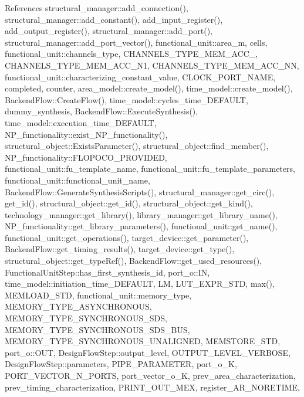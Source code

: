 References structural\+\_\+manager\+::add\+\_\+connection(), structural\+\_\+manager\+::add\+\_\+constant(), add\+\_\+input\+\_\+register(), add\+\_\+output\+\_\+register(), structural\+\_\+manager\+::add\+\_\+port(), structural\+\_\+manager\+::add\+\_\+port\+\_\+vector(), functional\+\_\+unit\+::area\+\_\+m, cells, functional\+\_\+unit\+::channels\+\_\+type, C\+H\+A\+N\+N\+E\+L\+S\+\_\+\+T\+Y\+P\+E\+\_\+\+M\+E\+M\+\_\+\+A\+C\+C\+\_, C\+H\+A\+N\+N\+E\+L\+S\+\_\+\+T\+Y\+P\+E\+\_\+\+M\+E\+M\+\_\+\+A\+C\+C\+\_\+\+N1, C\+H\+A\+N\+N\+E\+L\+S\+\_\+\+T\+Y\+P\+E\+\_\+\+M\+E\+M\+\_\+\+A\+C\+C\+\_\+\+NN, functional\+\_\+unit\+::characterizing\+\_\+constant\+\_\+value, C\+L\+O\+C\+K\+\_\+\+P\+O\+R\+T\+\_\+\+N\+A\+ME, completed, counter, area\+\_\+model\+::create\+\_\+model(), time\+\_\+model\+::create\+\_\+model(), Backend\+Flow\+::\+Create\+Flow(), time\+\_\+model\+::cycles\+\_\+time\+\_\+\+D\+E\+F\+A\+U\+LT, dummy\+\_\+synthesis, Backend\+Flow\+::\+Execute\+Synthesis(), time\+\_\+model\+::execution\+\_\+time\+\_\+\+D\+E\+F\+A\+U\+LT, N\+P\+\_\+functionality\+::exist\+\_\+\+N\+P\+\_\+functionality(), structural\+\_\+object\+::\+Exists\+Parameter(), structural\+\_\+object\+::find\+\_\+member(), N\+P\+\_\+functionality\+::\+F\+L\+O\+P\+O\+C\+O\+\_\+\+P\+R\+O\+V\+I\+D\+ED, functional\+\_\+unit\+::fu\+\_\+template\+\_\+name, functional\+\_\+unit\+::fu\+\_\+template\+\_\+parameters, functional\+\_\+unit\+::functional\+\_\+unit\+\_\+name, Backend\+Flow\+::\+Generate\+Synthesis\+Scripts(), structural\+\_\+manager\+::get\+\_\+circ(), get\+\_\+id(), structural\+\_\+object\+::get\+\_\+id(), structural\+\_\+object\+::get\+\_\+kind(), technology\+\_\+manager\+::get\+\_\+library(), library\+\_\+manager\+::get\+\_\+library\+\_\+name(), N\+P\+\_\+functionality\+::get\+\_\+library\+\_\+parameters(), functional\+\_\+unit\+::get\+\_\+name(), functional\+\_\+unit\+::get\+\_\+operations(), target\+\_\+device\+::get\+\_\+parameter(), Backend\+Flow\+::get\+\_\+timing\+\_\+results(), target\+\_\+device\+::get\+\_\+type(), structural\+\_\+object\+::get\+\_\+type\+Ref(), Backend\+Flow\+::get\+\_\+used\+\_\+resources(), Functional\+Unit\+Step\+::has\+\_\+first\+\_\+synthesis\+\_\+id, port\+\_\+o\+::\+IN, time\+\_\+model\+::initiation\+\_\+time\+\_\+\+D\+E\+F\+A\+U\+LT, LM, L\+U\+T\+\_\+\+E\+X\+P\+R\+\_\+\+S\+TD, max(), M\+E\+M\+L\+O\+A\+D\+\_\+\+S\+TD, functional\+\_\+unit\+::memory\+\_\+type, M\+E\+M\+O\+R\+Y\+\_\+\+T\+Y\+P\+E\+\_\+\+A\+S\+Y\+N\+C\+H\+R\+O\+N\+O\+US, M\+E\+M\+O\+R\+Y\+\_\+\+T\+Y\+P\+E\+\_\+\+S\+Y\+N\+C\+H\+R\+O\+N\+O\+U\+S\+\_\+\+S\+DS, M\+E\+M\+O\+R\+Y\+\_\+\+T\+Y\+P\+E\+\_\+\+S\+Y\+N\+C\+H\+R\+O\+N\+O\+U\+S\+\_\+\+S\+D\+S\+\_\+\+B\+US, M\+E\+M\+O\+R\+Y\+\_\+\+T\+Y\+P\+E\+\_\+\+S\+Y\+N\+C\+H\+R\+O\+N\+O\+U\+S\+\_\+\+U\+N\+A\+L\+I\+G\+N\+ED, M\+E\+M\+S\+T\+O\+R\+E\+\_\+\+S\+TD, port\+\_\+o\+::\+O\+UT, Design\+Flow\+Step\+::output\+\_\+level, O\+U\+T\+P\+U\+T\+\_\+\+L\+E\+V\+E\+L\+\_\+\+V\+E\+R\+B\+O\+SE, Design\+Flow\+Step\+::parameters, P\+I\+P\+E\+\_\+\+P\+A\+R\+A\+M\+E\+T\+ER, port\+\_\+o\+\_\+K, P\+O\+R\+T\+\_\+\+V\+E\+C\+T\+O\+R\+\_\+\+N\+\_\+\+P\+O\+R\+TS, port\+\_\+vector\+\_\+o\+\_\+K, prev\+\_\+area\+\_\+characterization, prev\+\_\+timing\+\_\+characterization, P\+R\+I\+N\+T\+\_\+\+O\+U\+T\+\_\+\+M\+EX, register\+\_\+\+A\+R\+\_\+\+N\+O\+R\+E\+T\+I\+ME, 